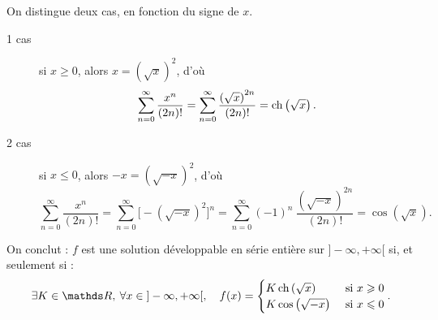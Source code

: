 On distingue deux cas, en fonction du signe de $x$.
\begin{description}
	\item[1 cas] si $x \ge 0$, alors $x = \left( \sqrt{x} \right)^2$, d'où \[
			\sum_{n=0}^\infty \frac{x^n}{(2n)!} = \sum_{n=0}^\infty \frac{\left( \sqrt{x} \right)^{2n}}{(2n)!} = \operatorname{ch}\left( \sqrt{x} \right)
		.\]
	\item[2 cas] si $x \le 0$, alors $-x = \left( \sqrt{-x} \right)^2$, d'où \[
			\sum_{n=0}^\infty \frac{x^n}{(2n)!} = \sum_{n=0}^\infty \Big[-\left( \sqrt{-x} \right)^2 \Big]^n = \sum_{n=0}^\infty (-1)^n\: \frac{\left(\sqrt{-x}\right)^{2n}}{(2n)!} = \cos\left( \sqrt{x} \right) 
		.\]
\end{description}
On conclut : $f$\/ est une solution développable en série entière sur $]-\infty,+\infty[$ si, et seulement si : \[
	\exists K \in \R,\: \forall x \in {]-\infty,+\infty[},
	\quad f(x) = \begin{cases}
		K \ch\left( \sqrt{x} \right) &\text{ si } x \ge 0\\
		K \cos\left( \sqrt{-x} \right) &\text{ si } x \le 0
	\end{cases}
.\] 



